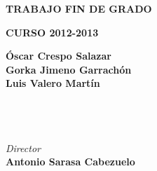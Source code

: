 \begin{frontmatter}

\thispagestyle{empty}


\vfill


  \begin{center}
				{}
  \end{center}

\vfill

\begin{center}
  {\Large {\bf TRABAJO FIN DE GRADO}}
\end{center}

\begin{center}
  {\Large {\bf CURSO 2012-2013}}
\end{center}

\vfill


\begin{large}
\begin{center}
\begin{Large}
  	{\bf \'Oscar Crespo Salazar}\\
	{\bf Gorka Jimeno Garrach\'on}\\
	{\bf Luis Valero Mart\'in}
\end{Large}
  \\ \mbox{ } \\ \mbox{ } \\ 
{\it Director}  \\ [0.3em]
  {\bf  Antonio Sarasa Cabezuelo}
  \vspace{.5ex}
\begin{large}
\begin{center}
\vspace{3ex}
\\[0.2em]
\\[0.2em]
\\[1em]
\end{center}
\end{large}
\end{center}


\end{large}
\end{frontmatter}
